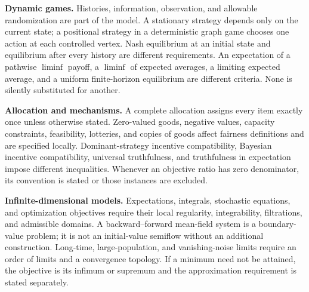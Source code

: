 \documentclass[11pt,a4paper]{article}
\begin{document}
\textbf{Dynamic games.} Histories, information, observation, and allowable
randomization are part of the model. A stationary strategy depends only on
the current state; a positional strategy in a deterministic graph game
chooses one action at each controlled vertex. Nash equilibrium at an initial
state and equilibrium after every history are different requirements.
An expectation of a pathwise $\liminf$ payoff, a $\liminf$ of expected averages,
a limiting expected average, and a uniform finite-horizon equilibrium are
different criteria. None is silently substituted for another.

\textbf{Allocation and mechanisms.} A complete allocation assigns every item
exactly once unless otherwise stated. Zero-valued goods, negative values,
capacity constraints, feasibility, lotteries, and copies of goods affect
fairness definitions and are specified locally. Dominant-strategy incentive
compatibility, Bayesian incentive compatibility, universal truthfulness,
and truthfulness in expectation impose different inequalities. Whenever
an objective ratio has zero denominator, its convention is stated or those
instances are excluded.

\textbf{Infinite-dimensional models.} Expectations, integrals, stochastic
equations, and optimization objectives require their local regularity,
integrability, filtrations, and admissible domains. A backward--forward
mean-field system is a boundary-value problem; it is not an initial-value
semiflow without an additional construction. Long-time, large-population,
and vanishing-noise limits require an order of limits and a convergence
topology. If a minimum need not be attained, the objective is its infimum
or supremum and the approximation requirement is stated separately.
\end{document}
